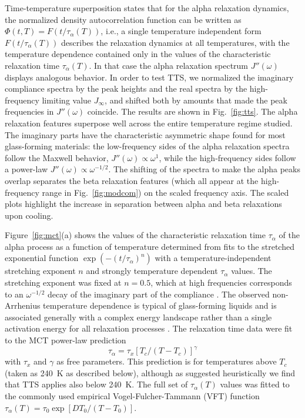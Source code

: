 \documentclass[reprint,showpacs,amsmath,amssymb,aip,jcp]{revtex4-1}
\begin{document}
Time-temperature superposition states that for the alpha relaxation
dynamics, the normalized density autocorrelation function can be
written as $\Phi(t,T) = F(t/\tau_{\alpha}(T))$, i.e., a single
temperature independent form $F(t/\tau_{\alpha}(T))$ describes the
relaxation dynamics at all temperatures, with the temperature
dependence contained only in the values of the characteristic
relaxation time $\tau_{\alpha}(T)$. In that case the alpha relaxation
spectrum $J''(\omega)$ displays analogous behavior. In order to test
TTS, we normalized the imaginary compliance spectra by the peak
heights and the real spectra by the high-frequency limiting value
$J_\infty$, and shifted both by amounts that made the peak frequencies
in $J''(\omega)$ coincide. The results are shown in
Fig.~\ref{fig:tts}. The alpha relaxation features superpose well
across the entire temperature regime studied. The imaginary parts have
the characteristic asymmetric shape found for most glass-forming
materials: the low-frequency sides of the alpha relaxation spectra
follow the Maxwell behavior, $J''(\omega) \propto \omega^1$, while the
high-frequency sides follow a power-law $J''(\omega) \propto
\omega^{-1/2}$. The shifting of the spectra to make the alpha peaks
overlap separates the beta relaxation features (which all appear at
the high-frequency range in Fig.~\ref{fig:modcom}) on the scaled
frequency axis. The scaled plots highlight the increase in separation
between alpha and beta relaxations upon cooling.

Figure~\ref{fig:mct}(a) shows the values of the characteristic
relaxation time $\tau_\alpha$ of the alpha process as a function of
temperature determined from fits to the stretched exponential function
$\exp(-(t/\tau_{\alpha})^n)$ with a temperature-independent stretching
exponent $n$ and strongly temperature dependent $\tau_\alpha$
values. The stretching exponent was fixed at $n = 0.5$, which at high
frequencies corresponds to an $\omega^{-1/2}$ decay of the imaginary
part of the compliance \cite{Barlow1967, Dyre2006, Nielsen2009}. The
observed non-Arrhenius temperature dependence is typical of
glass-forming liquids and is associated generally with a complex
energy landscape rather than a single activation energy for all
relaxation processes \cite{Angell1995, Debenedetti1996, Dyre2006,
  Roland2010, Berthier2011, Bohmer1993}. The relaxation time data were
fit to the MCT power-law prediction\cite{Gotze1992}
\begin{equation}\label{eq:tau}
\tau_{\alpha} = \tau_x \left[T_c/(T-T_c)\right]^{\gamma}
\end{equation}
with $\tau_x$ and $\gamma$ as free parameters. This prediction is for
temperatures above $T_c$ (taken as 240~K as described below), although
as suggested heuristically we find that TTS applies also below
240~K. The full set of $\tau_{\alpha}(T)$ values was fitted to the
commonly used empirical Vogel-Fulcher-Tammann (VFT) function
\cite{Vogel1921,Tammann1925} $\tau_{\alpha}(T) = \tau_0 \exp
\left[DT_0/(T - T_0)\right]$.
\end{document}
